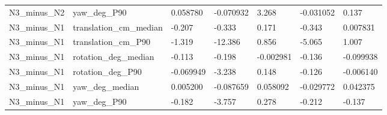 \begin{table}[t]
{\begin{tabular}{lllllll}
N3\_minus\_N2 & yaw\_deg\_P90 & 0.058780 & -0.070932 & 3.268 & -0.031052 & 0.137 \\
N3\_minus\_N1 & translation\_cm\_median & -0.207 & -0.333 & 0.171 & -0.343 & 0.007831 \\
N3\_minus\_N1 & translation\_cm\_P90 & -1.319 & -12.386 & 0.856 & -5.065 & 1.007 \\
N3\_minus\_N1 & rotation\_deg\_median & -0.113 & -0.198 & -0.002981 & -0.136 & -0.099938 \\
N3\_minus\_N1 & rotation\_deg\_P90 & -0.069949 & -3.238 & 0.148 & -0.126 & -0.006140 \\
N3\_minus\_N1 & yaw\_deg\_median & 0.005200 & -0.087659 & 0.058092 & -0.029772 & 0.042375 \\
N3\_minus\_N1 & yaw\_deg\_P90 & -0.182 & -3.757 & 0.278 & -0.212 & -0.137 \\
\hline
\end{tabular}}
\end{table}
